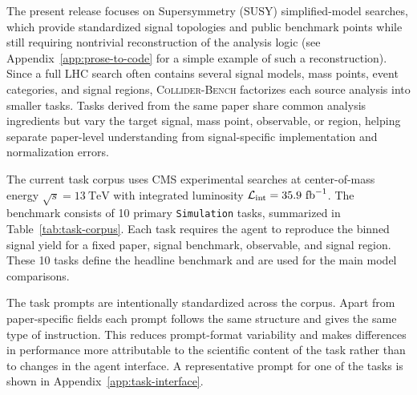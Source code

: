 \documentclass{article}
\newcommand{\ColliderBench}{\textsc{Collider-Bench}}
\begin{document}
The present release focuses on Supersymmetry (SUSY) simplified-model searches, which provide standardized signal topologies and public benchmark points while still requiring nontrivial reconstruction of the analysis logic (see Appendix~\ref{app:prose-to-code} for a simple example of such a reconstruction). Since a full LHC search often contains several signal models, mass points, event categories, and signal regions, \ColliderBench{} factorizes each source analysis into smaller tasks. Tasks derived from the same paper share common analysis ingredients but vary the target signal, mass point, observable, or region, helping separate paper-level understanding from signal-specific implementation and normalization errors.

The current task corpus uses CMS experimental searches at center-of-mass energy \(\sqrt{s}=13~\mathrm{TeV}\) with integrated luminosity \(\mathcal{L}_{\rm int}=35.9~\mathrm{fb}^{-1}\). The benchmark consists of 10 primary \texttt{Simulation} tasks, summarized in Table~\ref{tab:task-corpus}. Each task requires the agent to reproduce the binned signal yield for a fixed paper, signal benchmark, observable, and signal region. These 10 tasks define the headline benchmark and are used for the main model comparisons.

The task prompts are intentionally standardized across the corpus. Apart from paper-specific fields each prompt follows the same structure and gives the same type of instruction. This reduces prompt-format variability and makes differences in performance more attributable to the scientific content of the task rather than to changes in the agent interface. A representative prompt for one of the tasks is shown in Appendix~\ref{app:task-interface}.
\end{document}
